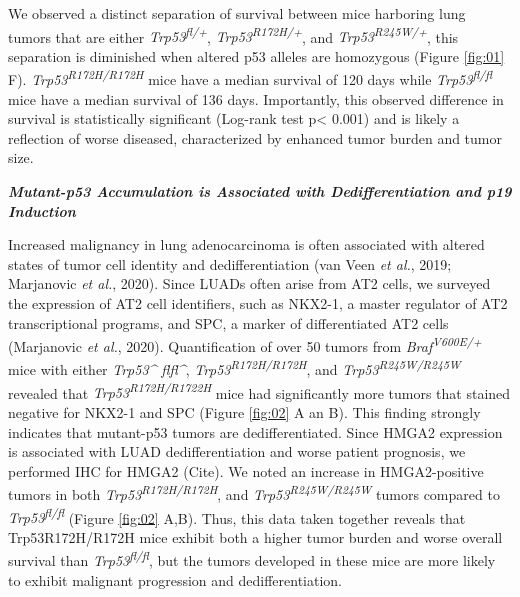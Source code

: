 We observed a distinct separation of survival between mice harboring lung tumors that are either \emph{Trp53\textsuperscript{fl/+}}, \emph{Trp53\textsuperscript{R172H/+}}, and \emph{Trp53\textsuperscript{R245W/+}}, this separation is diminished when altered p53 alleles are homozygous (Figure \ref{fig:01} F). \emph{Trp53\textsuperscript{R172H/R172H}} mice have a median survival of 120 days while \emph{Trp53\textsuperscript{fl/fl}} mice have a median survival of 136 days. Importantly, this observed difference in survival is statistically significant (Log-rank test p\textless{} 0.001) and is likely a reflection of worse diseased, characterized by enhanced tumor burden and tumor size.

\emph{\textbf{Mutant-p53 Accumulation is Associated with Dedifferentiation and p19 Induction}}

Increased malignancy in lung adenocarcinoma is often associated with altered states of tumor cell identity and dedifferentiation (van Veen \emph{et al.}, 2019; Marjanovic \emph{et al.}, 2020). Since LUADs often arise from AT2 cells, we surveyed the expression of AT2 cell identifiers, such as NKX2-1, a master regulator of AT2 transcriptional programs, and SPC, a marker of differentiated AT2 cells (Marjanovic \emph{et al.}, 2020). Quantification of over 50 tumors from \emph{Braf\textsuperscript{V600E/+}} mice with either \emph{Trp53\^{} flfl\^{}}, \emph{Trp53\textsuperscript{R172H/R172H}}, and \emph{Trp53\textsuperscript{R245W/R245W}} revealed that \emph{Trp53\textsuperscript{R172H/R1722H}} mice had significantly more tumors that stained negative for NKX2-1 and SPC (Figure \ref{fig:02} A an B). This finding strongly indicates that mutant-p53 tumors are dedifferentiated. Since HMGA2 expression is associated with LUAD dedifferentiation and worse patient prognosis, we performed IHC for HMGA2 (Cite). We noted an increase in HMGA2-positive tumors in both \emph{Trp53\textsuperscript{R172H/R172H}}, and \emph{Trp53\textsuperscript{R245W/R245W}} tumors compared to \emph{Trp53\textsuperscript{fl/fl}} (Figure \ref{fig:02} A,B). Thus, this data taken together reveals that Trp53R172H/R172H mice exhibit both a higher tumor burden and worse overall survival than \emph{Trp53\textsuperscript{fl/fl}}, but the tumors developed in these mice are more likely to exhibit malignant progression and dedifferentiation.

